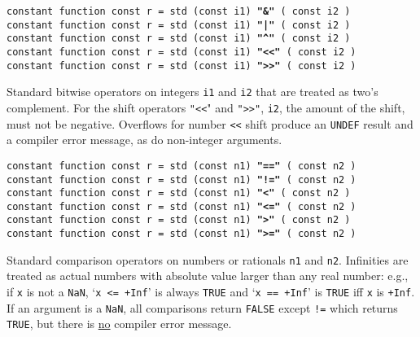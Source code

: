 \documentclass[12pt]{article}
\newcommand{\ttkey}[1]{{\tt \bfseries #1}}
\newenvironment{indpar}[1][0.3in]%
	{\begin{list}{}%
		     {\setlength{\itemsep}{0in}%
		      \setlength{\topsep}{0in}%
		      \setlength{\parsep}{1ex}%
		      \setlength{\labelwidth}{#1}%
		      \setlength{\leftmargin}{#1}%
		      \addtolength{\leftmargin}{\labelsep}}%
	 \item}%
	{\end{list}}
\begin{document}
{\tt constant function const r = std (const i1) \ttkey{"\&"} ( const i2 )} \\
{\tt constant function const r = std (const i1) \ttkey{"|"} ( const i2 )} \\
{\tt constant function const r = std (const i1) \ttkey{"\textasciicircum"}
                            ( const i2 )} \\
{\tt constant function const r = std (const i1) \ttkey{"<{}<"} ( const i2 )} \\
{\tt constant function const r = std (const i1) \ttkey{">{}>"} ( const i2 )}
\begin{indpar}
Standard bitwise operators on integers {\tt i1} and {\tt i2}
that are treated as two's complement.  For the shift operators
{\tt "<{}<}" and {\tt ">{}>"}, {\tt i2}, the amount of the shift,
must not be negative.  Overflows for number {\tt <{}<} shift
produce an {\tt UNDEF} result and a compiler error message,
as do non-integer arguments.
\end{indpar}

{\tt constant function const r = std (const n1) \ttkey{"=="} ( const n2 )} \\
{\tt constant function const r = std (const n1) \ttkey{"!="} ( const n2 )} \\
{\tt constant function const r = std (const n1) \ttkey{"<"} ( const n2 )} \\
{\tt constant function const r = std (const n1) \ttkey{"<="} ( const n2 )} \\
{\tt constant function const r = std (const n1) \ttkey{">"} ( const n2 )} \\
{\tt constant function const r = std (const n1) \ttkey{">="} ( const n2 )}
\begin{indpar}
Standard comparison operators on numbers or rationals {\tt n1} and {\tt n2}.
Infinities are treated as actual numbers with absolute value
larger than any real number: e.g., if {\tt x} is not a {\tt NaN},
`{\tt x <= +Inf}' is always
{\tt TRUE} and `{\tt x == +Inf}' is {\tt TRUE} iff {\tt x} is {\tt +Inf}.
If an argument is a {\tt NaN}, all comparisons return {\tt FALSE}
except {\tt !=} which returns {\tt TRUE}, but there is \underline{no} compiler
error message.
\end{indpar}
\end{document}
